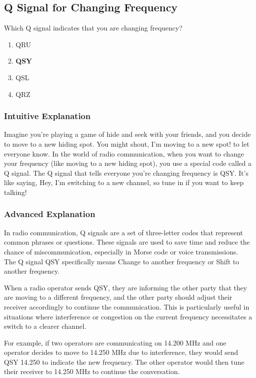 \subsection{Q Signal for Changing Frequency}\label{T2B11}

\begin{tcolorbox}[colback=gray!10!white,colframe=black!75!black,title=T2B11]
Which Q signal indicates that you are changing frequency?
\begin{enumerate}[label=\Alph*]
    \item QRU
    \item \textbf{QSY}
    \item QSL
    \item QRZ
\end{enumerate}
\end{tcolorbox}

\subsubsection{Intuitive Explanation}
Imagine you're playing a game of hide and seek with your friends, and you decide to move to a new hiding spot. You might shout, I'm moving to a new spot! to let everyone know. In the world of radio communication, when you want to change your frequency (like moving to a new hiding spot), you use a special code called a Q signal. The Q signal that tells everyone you're changing frequency is QSY. It's like saying, Hey, I'm switching to a new channel, so tune in if you want to keep talking!

\subsubsection{Advanced Explanation}
In radio communication, Q signals are a set of three-letter codes that represent common phrases or questions. These signals are used to save time and reduce the chance of miscommunication, especially in Morse code or voice transmissions. The Q signal QSY specifically means Change to another frequency or Shift to another frequency. 

When a radio operator sends QSY, they are informing the other party that they are moving to a different frequency, and the other party should adjust their receiver accordingly to continue the communication. This is particularly useful in situations where interference or congestion on the current frequency necessitates a switch to a clearer channel.

For example, if two operators are communicating on 14.200 MHz and one operator decides to move to 14.250 MHz due to interference, they would send QSY 14.250 to indicate the new frequency. The other operator would then tune their receiver to 14.250 MHz to continue the conversation.

